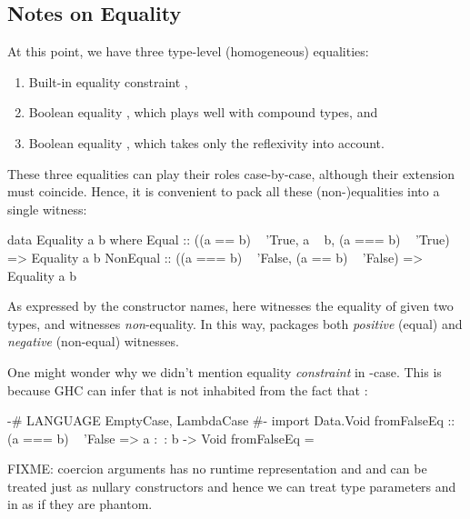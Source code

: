 \documentclass[demotion-paper.tex]{subfiles}
\begin{document}



\subsection{Notes on Equality}
At this point, we have three type-level (homogeneous) equalities:
\begin{enumerate}
\item Built-in equality constraint ,
\item Boolean equality , which plays well with compound types, and
\item Boolean equality , which takes only the reflexivity into account.
\end{enumerate}
These three equalities can play their roles case-by-case, although their extension must coincide.
Hence, it is convenient to pack all these (non-)equalities into a single witness:

\begin{code}
data Equality a b where
  Equal :: ((a == b) ~ 'True, a ~ b, (a === b) ~ 'True) => Equality a b
  NonEqual
    :: ((a === b) ~ 'False, (a == b) ~ 'False) => Equality a b
\end{code}

As expressed by the constructor names, here  witnesses the equality of given two types, and  witnesses \emph{non}-equality.
In this way,  packages both \emph{positive} (equal) and \emph{negative} (non-equal) witnesses.

One might wonder why we didn't mention equality \emph{constraint}  in -case.
This is because GHC can infer that  is not inhabited from the fact that :

\begin{code}
{-# LANGUAGE EmptyCase, LambdaCase #-}
import Data.Void
fromFalseEq :: (a === b) ~ 'False => a :~: b -> Void
fromFalseEq = \case {}
\end{code}

FIXME: coercion arguments has no runtime representation and {} and {} can be treated just as nullary constructors and hence we can treat type parameters {} and {} in {} as if they are phantom.
\end{document}
